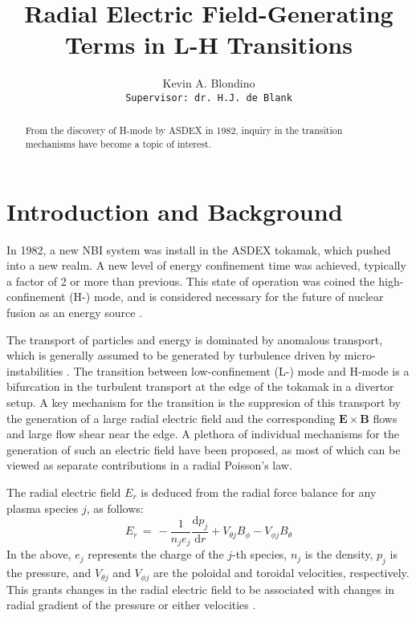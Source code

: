 \documentclass{article}
\author{Kevin A. Blondino \\
	\texttt{Supervisor: dr. H.J. de Blank}}
\title{Radial Electric Field-Generating Terms in L-H Transitions}
\date{}
\newcommand\mynotes[1]{\textcolor{red}{#1}}
\begin{document}
\maketitle


\begin{abstract}
	\mynotes{\lipsum[1]}
	From the discovery of H-mode by ASDEX in 1982, inquiry in the transition mechanisms have become a topic of interest.
\end{abstract}

\section{Introduction and Background}
In 1982, a new NBI system was install in the ASDEX tokamak, which pushed into a new realm.
A new level of energy confinement time was achieved, typically a factor of 2 or more than previous.
This state of operation was coined the high-confinement (H-) mode, and is considered necessary for the future of nuclear fusion as an energy source \cite{wagner_development_1984}.

The transport of particles and energy is dominated by anomalous transport, which is generally assumed to be generated by turbulence driven by micro-instabilities \cite{freidberg_plasma_2007}.
The transition between low-confinement (L-) mode and H-mode is a bifurcation in the turbulent transport at the edge of the tokamak in a divertor setup.
A key mechanism for the transition is the suppresion of this transport by the generation of a large radial electric field and the corresponding $\mathbf{E}\times\mathbf{B}$ flows and large flow shear near the edge.
A plethora of individual mechanisms for the generation of such an electric field have been proposed, as most of which can be viewed as separate contributions in a radial Poisson's law.

The radial electric field $E_r$ is deduced from the radial force balance for any plasma species $j$, as follows:
\begin{equation}
	E_r \,=\, -\frac{1}{n_j e_j} \frac{\text{d} p_j}{\text{d} r} + V_{\theta j} B_\phi - V_{\phi j} B_\theta
	\label{eq:E_r}
\end{equation}
In the above, $e_j$ represents the charge of the $j$-th species, $n_j$ is the density, $p_j$ is the pressure, and $V_{\theta j}$ and $V_{\phi j}$ are the poloidal and toroidal velocities, respectively. This grants changes in the radial electric field to be associated with changes in radial gradient of the pressure or either velocities \cite{connor_review_2000} \cite{staps_backstepping_2017}.
\end{document}
